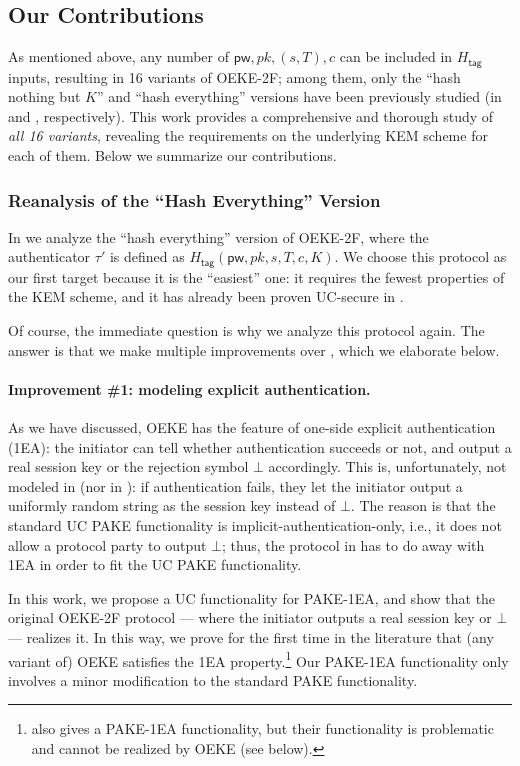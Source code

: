 \documentclass{article}
\theoremstyle{plain}
\theoremstyle{definition}
\theoremstyle{remark}
\newcommand{\Htag}{H_\mathsf{tag}}
\newcommand{\pw}{\mathsf{pw}}
\begin{document}
\subsection{Our Contributions}
As mentioned above, any number of $\pw,pk,(s,T),c$ can be included in $\Htag$ inputs, resulting in 16 variants of OEKE-2F; among them, only the ``hash nothing but $K$'' and ``hash everything'' versions have been previously studied (in \cite{EC:JanRoyXu25} and \cite{EPRINT:ArrBarJar25}, respectively). This work provides a comprehensive and thorough study of \emph{all 16 variants}, revealing the requirements on the underlying KEM scheme for each of them. Below we summarize our contributions.

\subsubsection{Reanalysis of the ``Hash Everything'' Version}
In  we analyze the ``hash everything'' version of OEKE-2F, where the authenticator $\tau'$ is defined as $\Htag(\pw,pk,s,T,c,K)$. We choose this protocol as our first target because it is the ``easiest'' one: it requires the fewest properties of the KEM scheme, and it has already been proven UC-secure in \cite{EPRINT:ArrBarJar25}.

Of course, the immediate question is why we analyze this protocol again. The answer is that we make multiple improvements over \cite{EPRINT:ArrBarJar25}, which we elaborate below.

\paragraph{Improvement \#1: modeling explicit authentication.}
As we have discussed, OEKE has the feature of one-side explicit authentication (1EA): the initiator can tell whether authentication succeeds or not, and output a real session key or the rejection symbol $\bot$ accordingly. This is, unfortunately, not modeled in \cite{EPRINT:ArrBarJar25} (nor in \cite{EC:JanRoyXu25}): if authentication fails, they let the initiator output a uniformly random string as the session key instead of $\bot$. The reason is that the standard UC PAKE functionality is implicit-authentication-only, i.e., it does not allow a protocol party to output $\bot$; thus, the protocol in \cite{EPRINT:ArrBarJar25} has to do away with 1EA in order to fit the UC PAKE functionality.

In this work, we propose a UC functionality for PAKE-1EA, and show that the original OEKE-2F protocol --- where the initiator outputs a real session key or $\bot$ --- realizes it. In this way, we prove for the first time in the literature that (any variant of) OEKE satisfies the 1EA property.\footnote{\cite{ACNS:BCPRR23} also gives a PAKE-1EA functionality, but their functionality is problematic and cannot be realized by OEKE (see  below).} Our PAKE-1EA functionality only involves a minor modification to the standard PAKE functionality.
\end{document}
